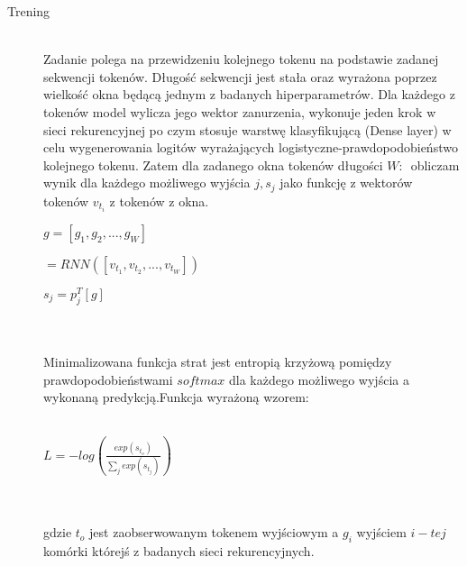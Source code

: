 \begin{description}
\item[Trening]
\hfill\\ 
Zadanie polega na przewidzeniu kolejnego tokenu na podstawie zadanej sekwencji tokenów. Długość sekwencji jest stała oraz wyrażona poprzez wielkość okna będącą jednym z badanych hiperparametrów. 
Dla każdego z tokenów model wylicza jego wektor zanurzenia, wykonuje jeden krok w sieci rekurencyjnej po czym stosuje warstwę klasyfikującą 
(Dense layer) w celu wygenerowania logitów wyrażających logistyczne-prawdopodobieństwo kolejnego tokenu. Zatem dla zadanego okna tokenów długości \begin{math}W\end{math}:
\begin{math}[t_1, t_2, ... t_W]\end{math} obliczam wynik dla każdego możliwego wyjścia \begin{math}j, s_j\end{math} jako funkcję z wektorów tokenów \begin{math}v_{t_i}\end{math}
z tokenów z okna.\\
\centerline{\begin{math}g = [g_1, g_2, ..., g_W]\end{math}}
\centerline{\begin{math}[g_1, g_2, ..., g_W] = RNN([v_{t_1}, v_{t_2}, ..., v_{t_W}])\end{math}}
\centerline{\begin{math}s_j=p_{j}^{T}[g]\end{math}}\\\\
Minimalizowana funkcja strat jest entropią krzyżową pomiędzy prawdopodobieństwami \begin{math}softmax\end{math} dla każdego możliwego wyjścia 
a wykonaną predykcją.Funkcja wyrażoną wzorem: \\\\
\centerline{\begin{math}L = -log(\frac{exp(s_{t_o})}{\sum_{j}exp(s_{t_j})})\end{math}}\\\\
gdzie \begin{math}t_o\end{math} jest zaobserwowanym tokenem wyjściowym a \begin{math}g_i\end{math} wyjściem \begin{math}i-tej\end{math} komórki
którejś z badanych sieci rekurencyjnych. 


\end{description}
